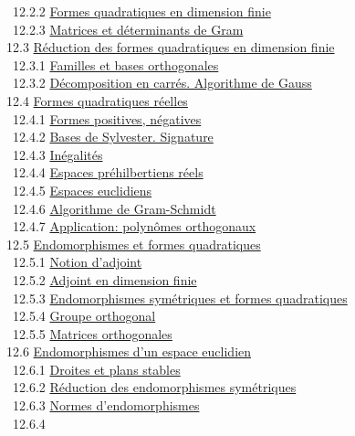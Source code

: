\documentclass[]{article}
\begin{document}
~~12.2.2 \href{coursse68.html\#x83-37300012.2.2}{Formes quadratiques en
dimension finie} \\ ~~12.2.3
\href{coursse68.html\#x83-37400012.2.3}{Matrices et déterminants de
Gram} \\ ~12.3 \href{coursse69.html\#x84-37500012.3}{Réduction des
formes quadratiques en dimension finie} \\ ~~12.3.1
\href{coursse69.html\#x84-37600012.3.1}{Familles et bases orthogonales}
\\ ~~12.3.2 \href{coursse69.html\#x84-37700012.3.2}{Décomposition en
carrés. Algorithme de Gauss} \\ ~12.4
\href{coursse70.html\#x85-37800012.4}{Formes quadratiques réelles} \\
~~12.4.1 \href{coursse70.html\#x85-37900012.4.1}{Formes positives,
négatives} \\ ~~12.4.2 \href{coursse70.html\#x85-38000012.4.2}{Bases de
Sylvester. Signature} \\ ~~12.4.3
\href{coursse70.html\#x85-38100012.4.3}{Inégalités} \\ ~~12.4.4
\href{coursse70.html\#x85-38200012.4.4}{Espaces préhilbertiens réels} \\
~~12.4.5 \href{coursse70.html\#x85-38300012.4.5}{Espaces euclidiens} \\
~~12.4.6 \href{coursse70.html\#x85-38400012.4.6}{Algorithme de
Gram-Schmidt} \\ ~~12.4.7
\href{coursse70.html\#x85-38500012.4.7}{Application: polynômes
orthogonaux} \\ ~12.5
\href{coursse71.html\#x86-38600012.5}{Endomorphismes et formes
quadratiques} \\ ~~12.5.1 \href{coursse71.html\#x86-38700012.5.1}{Notion
d'adjoint} \\ ~~12.5.2 \href{coursse71.html\#x86-38800012.5.2}{Adjoint
en dimension finie} \\ ~~12.5.3
\href{coursse71.html\#x86-38900012.5.3}{Endomorphismes symétriques et
formes quadratiques} \\ ~~12.5.4
\href{coursse71.html\#x86-39000012.5.4}{Groupe orthogonal} \\ ~~12.5.5
\href{coursse71.html\#x86-39100012.5.5}{Matrices orthogonales} \\ ~12.6
\href{coursse72.html\#x87-39200012.6}{Endomorphismes d'un espace
euclidien} \\ ~~12.6.1 \href{coursse72.html\#x87-39300012.6.1}{Droites
et plans stables} \\ ~~12.6.2
\href{coursse72.html\#x87-39400012.6.2}{Réduction des endomorphismes
symétriques} \\ ~~12.6.3 \href{coursse72.html\#x87-39500012.6.3}{Normes
d'endomorphismes} \\ ~~12.6.4
\end{document}
